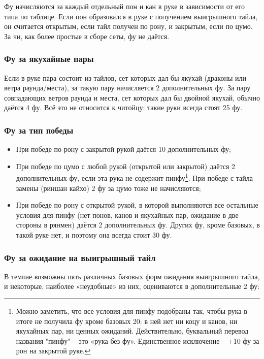 Фу начисляются за каждый отдельный пон и кан в руке в зависимости от его типа по таблице. Если пон образовался в руке с получением выигрышного тайла, он считается открытым, если тайл получен по рону, и закрытым, если по цумо. За чи, как более простые в сборе сеты, фу не даётся.

\subsubsection{Фу за якухайные пары}

Если в руке пара состоит из тайлов, сет которых дал бы якухай (драконы или ветра раунда/места), за такую пару начисляется 2 дополнительных фу. За пару совпадающих ветров раунда и места, сет которых дал бы двойной якухай, обычно даётся 4 фу. Всё это не относится к читойцу: такие руки всегда стоят 25 фу.

\subsubsection{Фу за тип победы}

\begin{itemize}
	\item При победе по рону с закрытой рукой даётся 10 дополнительных фу;
	\item При победе по цумо с любой рукой (открытой или закрытой) даётся 2 дополнительных фу, если эта рука не содержит пинфу\footnote{Можно заметить, что все условия для пинфу подобраны так, чтобы рука в итоге не получила фу кроме базовых 20: в ней нет ни коцу и канов, ни якухайных пар, ни ценных ожиданий. Действительно, буквальный перевод названия "пинфу" – это «рука без фу». Единственное исключение – +10 фу за рон на закрытой руке.}. При победе с тайла замены (риншан кайхо) 2 фу за цумо тоже не начисляются;
	\item При победе по рону с открытой рукой, в которой выполняются все остальные условия для пинфу (нет понов, канов и якухайных пар, ожидание в две стороны в рянмен) даётся 2 дополнительных фу. Других фу, кроме базовых, в такой руке нет, и поэтому она всегда стоит 30 фу.
\end{itemize}

\subsubsection{Фу за ожидание на выигрышный тайл}

В темпае возможны пять различных базовых форм ожидания выигрышного тайла, и некоторые, наиболее «неудобные» из них, оцениваются в дополнительные 2 фу:

